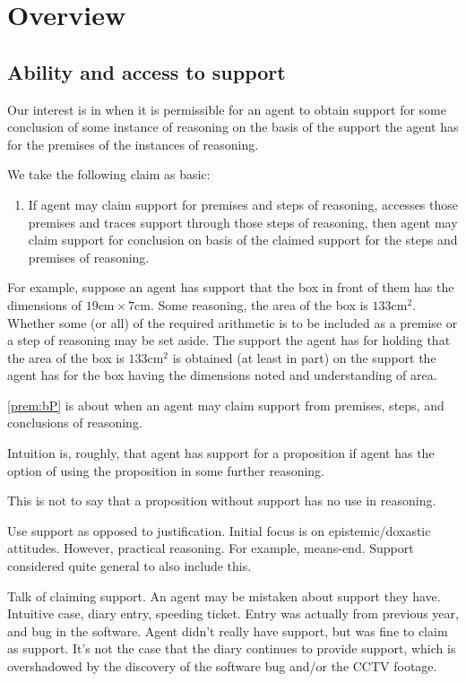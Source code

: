 
\chapter{Overview}
\label{cha:overview}

\section{Ability and access to support}
\label{sec:abil-access-supp}

\begin{note}
  Our interest is in when it is permissible for an agent to obtain support for some conclusion of some instance of reasoning on the basis of the support the agent has for the premises of the instances of reasoning.

  We take the following claim as basic:
  \begin{enumerate}[label=\bP{}, ref=\bP{}]
  \item\label{prem:bP} If agent may claim support for premises and steps of reasoning, accesses those premises and traces support through those steps of reasoning, then agent may claim support for conclusion on basis of the claimed support for the steps and premises of reasoning.
  \end{enumerate}
  For example, suppose an agent has support that the box in front of them has the dimensions of \(19\text{cm} \times 7\text{cm}\).
  Some reasoning, the area of the box is \(133\text{cm}^{2}\).
  Whether some (or all) of the required arithmetic is to be included as a premise or a step of reasoning may be set aside.
  The support the agent has for holding that the area of the box is \(133\text{cm}^{2}\) is obtained (at least in part) on the support the agent has for the box having the dimensions noted and understanding of area.
\end{note}

\begin{note}[Support]
  \ref{prem:bP} is about when an agent may claim support from premises, steps, and conclusions of reasoning.
  

  Intuition is, roughly, that agent has support for a proposition if agent has the option of using the proposition in some further reasoning.

  This is not to say that a proposition without support has no use in reasoning.

  Use support as opposed to justification.
  Initial focus is on epistemic/doxastic attitudes.
  However, practical reasoning.
  For example, means-end.
  Support considered quite general to also include this.

  Talk of claiming support.
  An agent may be mistaken about support they have.
  Intuitive case, diary entry, speeding ticket.
  Entry was actually from previous year, and bug in the software.
  Agent didn't really have support, but was fine to claim as support.
  It's not the case that the diary continues to provide support, which is overshadowed by the discovery of the software bug and/or the CCTV footage.
\end{note}

